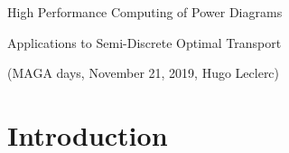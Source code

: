 \documentclass[aspectratio=169]{beamer}
\begin{document}
\begin{frame}
    \begin{center}
        {\huge High Performance Computing of Power Diagrams}

        \bigskip
        {\large Applications to Semi-Discrete Optimal Transport}
      
        \vfill
        {(MAGA days, November 21, 2019, Hugo Leclerc)}
    \end{center}
\end{frame}

\section*{Introduction}
\end{document}
